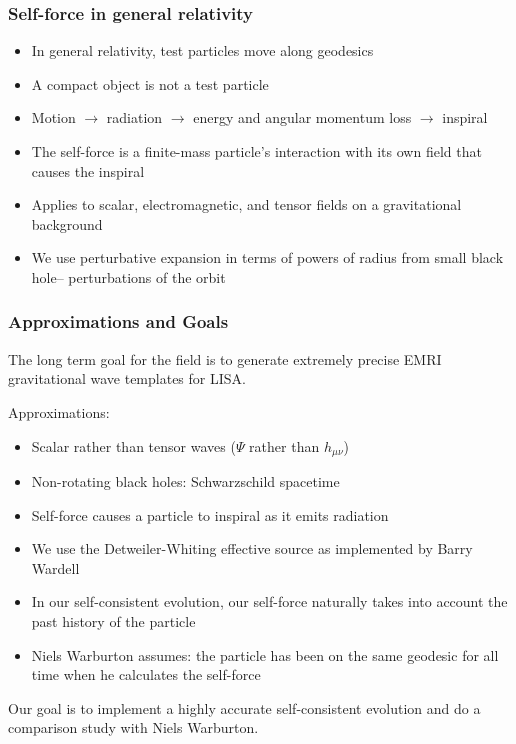 \documentclass{beamer}
\begin{document}
\begin{frame}
  \frametitle{Self-force in general relativity}
  \begin{itemize}
  \item In general relativity, test particles move along geodesics
  \item A compact object is not a test particle
  \item Motion $\rightarrow$ radiation $\rightarrow$ energy and angular momentum loss $\rightarrow$ inspiral
  \item The self-force is a finite-mass particle's interaction with its own field that causes the inspiral
  \item Applies to scalar, electromagnetic, and tensor fields on a gravitational background
  \item We use perturbative expansion in terms of powers of radius from small black hole-- perturbations of the orbit
  \end{itemize}
\end{frame}

\begin{frame}
  \frametitle{Approximations and Goals}
  The long term goal for the field is to generate extremely precise EMRI gravitational wave templates for LISA.

  Approximations:
  \begin{itemize}
  \item Scalar rather than tensor waves ($\Psi$ rather than $h_{\mu\nu}$)
  \item Non-rotating black holes: Schwarzschild spacetime
  \item Self-force causes a particle to inspiral as it emits radiation
  \item We use the Detweiler-Whiting effective source as implemented by Barry Wardell
  \item In our self-consistent evolution, our self-force naturally takes into account the past history of the particle
  \item Niels Warburton assumes: the particle has been on the same geodesic for all time when he calculates the self-force
  \end{itemize}
  
  Our goal is to implement a highly accurate self-consistent evolution and do a comparison study with Niels Warburton.
  
\end{frame}
\end{document}
